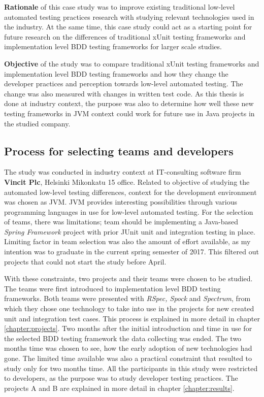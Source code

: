     \textbf{Rationale} of this case study was to improve existing traditional low-level automated testing practices research with studying
    relevant technologies used in the industry. At the same time, this case study could act as a starting point for future
    research on the differences of traditional xUnit testing frameworks and implementation level BDD testing frameworks for larger
    scale studies.

    \textbf{Objective} of the study was to compare traditional xUnit testing frameworks and implementation level BDD testing frameworks
    and how they change the developer practices and perception towards low-level automated testing. The change was also measured
    with changes in written test code.
    As this thesis is done at industry context, the purpose was also to determine how well these
    new testing frameworks in JVM context could work for future use in Java projects in the studied company.


\subsection{Process for selecting teams and developers}
    The study was conducted in industry context at IT-consulting software firm \textbf{Vincit Plc}, Helsinki Mikonkatu 15 office.
    Related to objective of studying the automated low-level testing differences, context for the development environment was chosen as JVM.
    JVM provides interesting possibilities through various programming languages in use for low-level automated testing.
    For the selection of teams, there was limitations; team should be implementing a Java-based \textit{Spring Framework} project with prior JUnit
    unit and integration testing in place. Limiting factor in team selection was also the amount of effort available,
    as my intention was to graduate in the current spring semester of 2017.  This filtered out projects that could not start
    the study before April.

    With these constraints, two projects and their teams were chosen to be studied. The teams were first introduced to
    implementation level BDD testing frameworks. Both teams were presented with \textit{RSpec, Spock} and \textit{Spectrum}, from
    which they chose one technology to take into use in the projects for new created unit and integration test cases. This
    process is explained in more detail in chapter \ref{chapter:projects}. Two months after the initial introduction and time in use for
    the selected BDD testing framework the data collecting was ended. The two months time was chosen to see, how the early
    adoption of new technologies had gone.
    The limited time available was also a practical constraint that resulted to study only for two months time. All the participants
    in this study were restricted to developers, as the purpose was to study developer testing practices. The projects
    A and B are explained in more detail in chapter \ref{chapter:results}.

